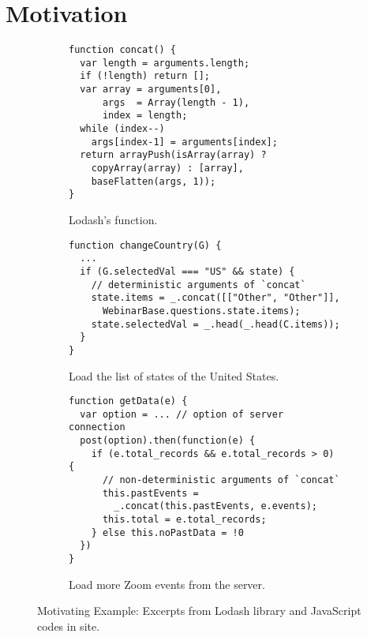 \section{Motivation}\label{sec:motivation}

\begin{figure}[t]
  \centering
  \begin{subfigure}[t]{0.5\textwidth}
    \begin{lstlisting}[style=myJSstyle]
function concat() {
  var length = arguments.length;
  if (!length) return [];
  var array = arguments[0],
      args  = Array(length - 1),
      index = length;
  while (index--)
    args[index-1] = arguments[index];
  return arrayPush(isArray(array) ?
    copyArray(array) : [array],
    baseFlatten(args, 1));
}
    \end{lstlisting}
    \vspace*{-1em}
    \caption{Lodash's  function.}
    \label{fig:concat}
  \end{subfigure}
  \begin{subfigure}[t]{0.5\textwidth}
    \begin{lstlisting}[style=myJSstyle,firstnumber=13]
function changeCountry(G) {
  ...
  if (G.selectedVal === "US" && state) {
    // deterministic arguments of `concat`
    state.items = _.concat([["Other", "Other"]],
      WebinarBase.questions.state.items);
    state.selectedVal = _.head(_.head(C.items));
  }
}
    \end{lstlisting}
    \vspace*{-1em}
    \caption{Load the list of states of the United States.}
    \label{fig:changeCountry}
  \end{subfigure}
  \begin{subfigure}[t]{0.5\textwidth}
    \begin{lstlisting}[style=myJSstyle,firstnumber=22]
function getData(e) {
  var option = ... // option of server connection
  post(option).then(function(e) {
    if (e.total_records && e.total_records > 0) {
      // non-deterministic arguments of `concat`
      this.pastEvents =
        _.concat(this.pastEvents, e.events);
      this.total = e.total_records;
    } else this.noPastData = !0
  })
}
    \end{lstlisting}
    \vspace*{-1em}
    \caption{Load more Zoom events from the server.}
    \label{fig:getData}
  \end{subfigure}
  \vspace*{-1em}
  \caption{Motivating Example: Excerpts from Lodash library and JavaScript codes
  in  site.}
  \label{fig:example}
  \vspace*{-1em}
\end{figure}

